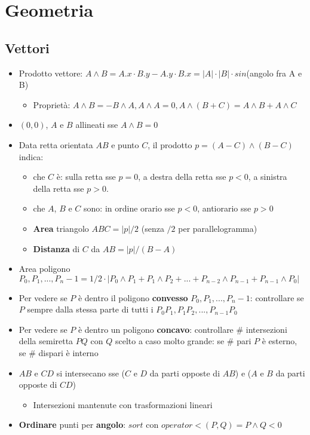 \section{Geometria}

\subsection{Vettori}
\begin{itemize}
    \item Prodotto vettore: $A\wedge B = A.x\cdot B.y - A.y\cdot B.x = |A|\cdot|B|\cdot sin$(angolo fra A e B)
    \begin{itemize}
        \item Proprietà: $A\wedge B = -B\wedge A, A\wedge A = 0, A\wedge {(B+C)} = A\wedge B + A\wedge C$
    \end{itemize}
    \item $(0,0)$, $A$ e $B$ allineati sse $A\wedge B = 0$
    \item Data retta orientata $AB$ e punto $C$, il prodotto $p=(A-C)\wedge {(B-C)}$ indica:
    \begin{itemize}
        \item che $C$ è: sulla retta sse $p=0$, a destra della retta sse $p<0$, a sinistra della retta sse $p>0$.
        \item che $A$, $B$ e $C$ sono: in ordine orario sse $p<0$, antiorario sse $p>0$
        \item \textbf{Area} triangolo $ABC = |p|/2$ (senza $/2$ per parallelogramma)
        \item \textbf{Distanza} di $C$ da $AB = |p|/(B-A)$
    \end{itemize}
    \item Area poligono $P_0, P_1, ..., P_n-1 = 1/2 \cdot |P_0 \wedge P_1 + P_1 \wedge P_2 + ... + P_{n-2} \wedge P_{n-1} + P_{n-1} \wedge P_0|$
    \item Per vedere se $P$ è dentro il poligono \textbf{convesso} $P_0, P_1, ..., P_n-1$: controllare se $P$ sempre dalla stessa parte di tutti i $P_0P_1, P_1P_2, ..., P_{n-1}P_0$
    \item Per vedere se $P$ è dentro un poligono \textbf{concavo}: controllare $\#$ intersezioni della semiretta $PQ$ con $Q$ scelto a caso molto grande: se $\#$ pari $P$ è esterno, se $\#$ dispari è interno
    \item $AB$ e $CD$ si intersecano sse ($C$ e $D$ da parti opposte di $AB$) e ($A$ e $B$ da parti opposte di $CD$)
    \begin{itemize}
        \item Intersezioni mantenute con trasformazioni lineari
    \end{itemize}
    \item \textbf{Ordinare} punti per \textbf{angolo}: $sort$ con $operator<(P,Q) = P \wedge Q < 0$
\end{itemize}

